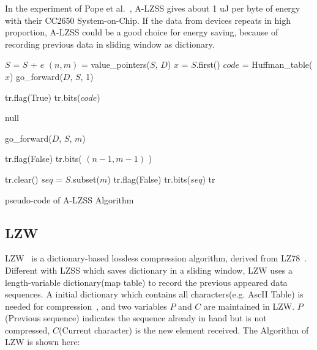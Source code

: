 In the experiment of Pope et al.~\cite{pope2018accelerometer}, A-LZSS gives
about 1 uJ per byte of energy with their CC2650 System-on-Chip. If the data from
devices repeats in high proportion, A-LZSS could be a good choice for energy
saving, because of recording previous data in sliding window as dictionary.
\begin{algorithm}
\begin{algorithmic}[1]
\Input
\EndInput
\Output
\EndOutput

\State $S$ = $S$ + $e$  
\State $(n, m)$ = value\_pointers($S$, $D$)  
    \State $x$ = $S$.first()    
    \State $code$ = Huffman\_table($x$)
    \State go\_forward($D$, $S$, 1) 
    
    \State tr.flag(True)    
    \State tr.bits($code$)  
    
   
    \State \Return null     
    
\Else                       {}
    \State go\_forward($D$, $S$, $m$) 
    
    \State tr.flag(False)
    \State tr.bits( $(n-1, m-1)$ )  
\EndIf

 
    \State tr.clear()
    \State $seq$ = $S$.subset($m$) 
    \State tr.flag(False)
    \State tr.bits($seq$)   
\EndIf
\State \Return tr

\end{algorithmic}
\caption{pseudo-code of A-LZSS Algorithm}
\label{algo:A-LZSS}
\end{algorithm}

\subsection{LZW}
LZW~\cite{welch1984technique} is a dictionary-based lossless compression
algorithm, derived from LZ78~\cite{ziv1978compression}. Different with LZSS
which saves dictionary in a sliding window, LZW uses a length-variable
dictionary(map table) to record the previous appeared data sequences. A initial
dictionary which contains all characters(e.g. AscII Table) is needed for
compression~\cite{welch1984technique}, and two variables $P$ and $C$ are
maintained in LZW. $P$(Previous sequence) indicates the sequence already in hand
but is not compressed, $C$(Current character) is the new element received. The
Algorithm of LZW is shown here:

